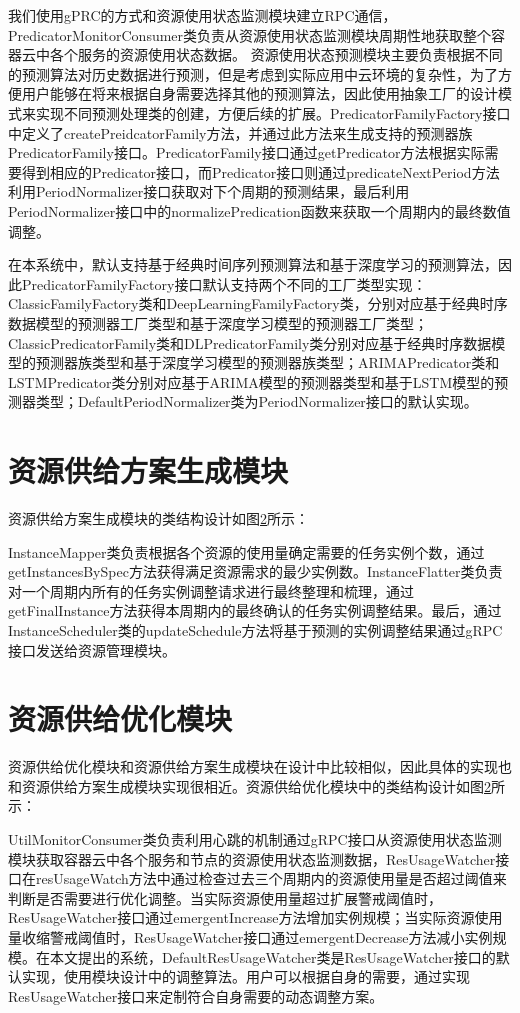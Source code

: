 我们使用gPRC的方式和资源使用状态监测模块建立RPC通信，PredicatorMonitorConsumer类负责从资源使用状态监测模块周期性地获取整个容器云中各个服务的资源使用状态数据。
资源使用状态预测模块主要负责根据不同的预测算法对历史数据进行预测，但是考虑到实际应用中云环境的复杂性，为了方便用户能够在将来根据自身需要选择其他的预测算法，因此使用抽象工厂的设计模式来实现不同预测处理类的创建，方便后续的扩展。PredicatorFamilyFactory接口中定义了createPreidcatorFamily方法，并通过此方法来生成支持的预测器族PredicatorFamily接口。PredicatorFamily接口通过getPredicator方法根据实际需要得到相应的Predicator接口，而Predicator接口则通过predicateNextPeriod方法利用PeriodNormalizer接口获取对下个周期的预测结果，最后利用PeriodNormalizer接口中的normalizePredication函数来获取一个周期内的最终数值调整。

在本系统中，默认支持基于经典时间序列预测算法和基于深度学习的预测算法，因此PredicatorFamilyFactory接口默认支持两个不同的工厂类型实现：ClassicFamilyFactory类和DeepLearningFamilyFactory类，分别对应基于经典时序数据模型的预测器工厂类型和基于深度学习模型的预测器工厂类型；ClassicPredicatorFamily类和DLPredicatorFamily类分别对应基于经典时序数据模型的预测器族类型和基于深度学习模型的预测器族类型；ARIMAPredicator类和LSTMPredicator类分别对应基于ARIMA模型的预测器类型和基于LSTM模型的预测器类型；DefaultPeriodNormalizer类为PeriodNormalizer接口的默认实现。

\section{资源供给方案生成模块}
资源供给方案生成模块的类结构设计如图\ref{}所示：

InstanceMapper类负责根据各个资源的使用量确定需要的任务实例个数，通过getInstancesBySpec方法获得满足资源需求的最少实例数。InstanceFlatter类负责对一个周期内所有的任务实例调整请求进行最终整理和梳理，通过getFinalInstance方法获得本周期内的最终确认的任务实例调整结果。最后，通过InstanceScheduler类的updateSchedule方法将基于预测的实例调整结果通过gRPC接口发送给资源管理模块。

\section{资源供给优化模块}
资源供给优化模块和资源供给方案生成模块在设计中比较相似，因此具体的实现也和资源供给方案生成模块实现很相近。资源供给优化模块中的类结构设计如图\ref{}所示：

UtilMonitorConsumer类负责利用心跳的机制通过gRPC接口从资源使用状态监测模块获取容器云中各个服务和节点的资源使用状态监测数据，ResUsageWatcher接口在resUsageWatch方法中通过检查过去三个周期内的资源使用量是否超过阈值来判断是否需要进行优化调整。当实际资源使用量超过扩展警戒阈值时，ResUsageWatcher接口通过emergentIncrease方法增加实例规模；当实际资源使用量收缩警戒阈值时，ResUsageWatcher接口通过emergentDecrease方法减小实例规模。在本文提出的系统，DefaultResUsageWatcher类是ResUsageWatcher接口的默认实现，使用模块设计中的调整算法。用户可以根据自身的需要，通过实现ResUsageWatcher接口来定制符合自身需要的动态调整方案。

